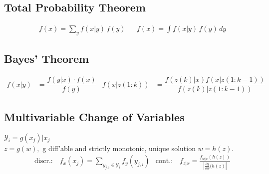 \documentclass[landscape,a4paper,8pt]{scrartcl}
\begin{document}
\begin{multicols*}{3}
\subsection{Total Probability Theorem}
\vspace{-5pt}
\begin{align*}
&f(x) = \sum_y f(x|y) \, f(y)  & &f(x) = \int f(x|y) \, f(y) \, dy
\end{align*}

\subsection{Bayes' Theorem}
\begin{align*}
f(x|y) & = \dfrac{f(y|x)\cdot f(x)}{f(y)} & 
f(x|z(1:k)) & = \dfrac{f(z(k)|x)f(x|z(1:k-1))}{f(z(k)|z(1:k-1))}
\end{align*}

\subsection{Multivariable Change of Variables}
$\mathcal{Y}_i = { g(x_j) | x_j }$ \\
$z = g(w),$ g diff'able and strictly monotonic, unique solution $w = h(z)$.
\begin{align*}
&\text{discr.:} \quad f_x(x_j) = \sum_{y_{j,i} \in \mathcal{Y}_i} f_y(y_{j,i}) & \text{cont.:} \quad  f_{z|x} = \frac{f_{w|x}(h(z))}{\left|   \frac{\partial g}{\partial w}(h(z)  \right|}
\end{align*}

%


\end{multicols*}
\end{document}
